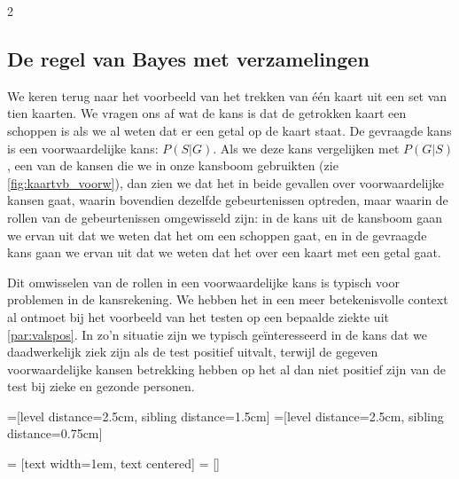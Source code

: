 \begin{multicols} {2}
\subsection*{De regel van Bayes met verzamelingen}

We keren terug naar het voorbeeld van het trekken van één kaart uit een set van tien kaarten. We vragen ons af wat de kans is dat de getrokken kaart een schoppen is als we al weten dat er een getal op de kaart staat. De gevraagde kans is een voorwaardelijke kans: $P(S|G)$. Als we deze kans vergelijken met $P(G|S)$, een van de kansen die we in onze kansboom gebruikten (zie \autoref{fig:kaartvb_voorw}), dan zien we dat het in beide gevallen over voorwaardelijke kansen gaat, waarin bovendien dezelfde gebeurtenissen optreden, maar waarin de rollen van de gebeurtenissen omgewisseld zijn: in de kans uit de kansboom gaan we ervan uit dat we weten dat het om een schoppen gaat, en in de gevraagde kans gaan we ervan uit dat we weten dat het over een kaart met een getal gaat.

Dit omwisselen van de rollen in een voorwaardelijke kans is typisch voor problemen in de kansrekening. We hebben het in een meer betekenisvolle context al ontmoet bij het voorbeeld van het testen op een bepaalde ziekte uit \autoref{par:valspos}. In zo’n situatie zijn we typisch geïnteresseerd in de kans dat we daadwerkelijk ziek zijn als de test positief uitvalt, terwijl de gegeven voorwaardelijke kansen betrekking hebben op het al dan niet positief zijn van de test bij zieke en gezonde personen. 
\vspace{0.5cm}

=[level distance=2.5cm, sibling distance=1.5cm]
=[level distance=2.5cm, sibling distance=0.75cm]

 = [text width=1em, text centered]
 = []


\end{multicols}
